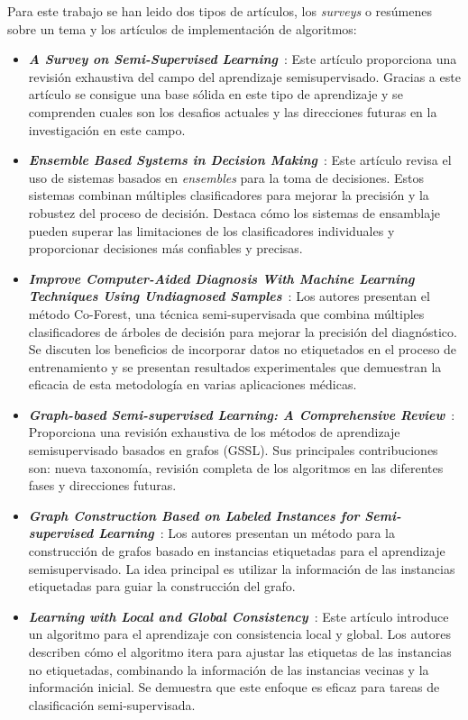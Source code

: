 Para este trabajo se han leido dos tipos de artículos, los \textit{surveys} o resúmenes sobre un tema y los artículos de implementación de algoritmos:
\begin{itemize}
	\item \textbf{\textit{A Survey on Semi-Supervised Learning}}~\cite{Engelen:semi-supervised}: Este artículo proporciona una revisión exhaustiva del campo del aprendizaje semisupervisado. Gracias a este artículo se consigue una base sólida en este tipo de aprendizaje y se comprenden cuales son los desafios actuales y las direcciones futuras en la investigación en este campo.
	\item \textbf{\textit{Ensemble Based Systems in Decision Making}}~\cite{ensembles}: Este artículo revisa el uso de sistemas basados en \textit{ensembles} para la toma de decisiones. Estos sistemas combinan múltiples clasificadores para mejorar la precisión y la robustez del proceso de decisión. Destaca cómo los sistemas de ensamblaje pueden superar las limitaciones de los clasificadores individuales y proporcionar decisiones más confiables y precisas.
	\item \textbf{\textit{Improve Computer-Aided Diagnosis With Machine Learning Techniques Using Undiagnosed Samples}}~\cite{IEEE:CoForest}: Los autores presentan el método Co-Forest, una técnica semi-supervisada que combina múltiples clasificadores de árboles de decisión para mejorar la precisión del diagnóstico. Se discuten los beneficios de incorporar datos no etiquetados en el proceso de entrenamiento y se presentan resultados experimentales que demuestran la eficacia de esta metodología en varias aplicaciones médicas.
	\item \textbf{\textit{Graph-based Semi-supervised Learning: A Comprehensive Review}}~\cite{GSSL:review}: Proporciona una revisión exhaustiva de los métodos de aprendizaje semisupervisado basados en grafos (GSSL). Sus principales contribuciones son: nueva taxonomía, revisión completa de los algoritmos en las diferentes fases y direcciones futuras.
	\item \textbf{\textit{Graph Construction Based on Labeled Instances for Semi-supervised Learning}}~\cite{gbili}: Los autores presentan un método para la construcción de grafos basado en instancias etiquetadas para el aprendizaje semisupervisado. La idea principal es utilizar la información de las instancias etiquetadas para guiar la construcción del grafo.
	\item \textbf{\textit{Learning with Local and Global Consistency}}~\cite{LGC}: Este artículo introduce un algoritmo para el aprendizaje con consistencia local y global. Los autores describen cómo el algoritmo itera para ajustar las etiquetas de las instancias no etiquetadas, combinando la información de las instancias vecinas y la información inicial. Se demuestra que este enfoque es eficaz para tareas de clasificación semi-supervisada.

\end{itemize}
